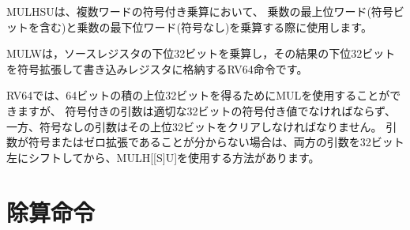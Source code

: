 \begin{commentary}
\begin{comment}
MULHSU is used in multi-word signed multiplication to multiply the
most-significant word of the multiplicand (which contains the sign bit)
with the less-significant words of the multiplier (which are unsigned).
\end{comment}
MULHSUは、複数ワードの符号付き乗算において、
乗数の最上位ワード(符号ビットを含む)と乗数の最下位ワード(符号なし)を乗算する際に使用します。
\end{commentary}

\begin{comment}
MULW is an RV64 instruction that multiplies the lower 32 bits of the source
registers, placing the sign-extension of the lower 32 bits of the result
into the destination register.
\end{comment}

MULWは，ソースレジスタの下位32ビットを乗算し，その結果の下位32ビットを符号拡張して書き込みレジスタに格納するRV64命令です。

\begin{commentary}
\begin{comment}
In RV64, MUL can be used to obtain the upper 32 bits of the 64-bit product,
but signed arguments must be proper 32-bit signed values, whereas unsigned
arguments must have their upper 32 bits clear.  If the
arguments are not known to be sign- or zero-extended, an alternative is to
shift both arguments left by 32 bits, then use MULH[[S]U].
\end{comment}
RV64では、64ビットの積の上位32ビットを得るためにMULを使用することができますが、
符号付きの引数は適切な32ビットの符号付き値でなければならず、一方、符号なしの引数はその上位32ビットをクリアしなければなりません。
引数が符号またはゼロ拡張であることが分からない場合は、両方の引数を32ビット左にシフトしてから、MULH[[S]U]を使用する方法があります。
\end{commentary}

\begin{comment}
\section{Division Operations}
\end{comment}
\section{除算命令}

